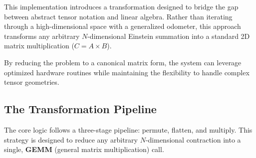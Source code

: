 \documentclass[binding=0.6cm]{sapthesis}
\begin{document}
This implementation introduces a transformation designed to bridge the gap between abstract tensor notation and linear algebra. Rather than iterating through a high-dimensional space with a generalized odometer, this approach transforms any arbitrary $N$-dimensional Einstein summation into a standard 2D matrix multiplication ($C = A \times B$).

By reducing the problem to a canonical matrix form, the system can leverage optimized hardware routines while maintaining the flexibility to handle complex tensor geometries.

\subsection{The Transformation Pipeline}

The core logic follows a three-stage pipeline: permute, flatten, and multiply. This strategy is designed to reduce any arbitrary $N$-dimensional contraction into a single, \textbf{GEMM} (general matrix multiplication) call.
\end{document}
